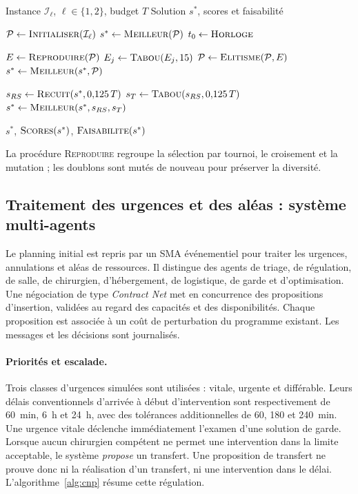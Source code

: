 \documentclass[11pt,a4paper]{article}
\begin{document}
\begin{algorithm}[htbp]
\caption{Schéma de l'hybridation mémétique}
\label{alg:memetique}
\begin{algorithmic}[1]

\Require Instance $\mathcal{I}_{\ell}$, $\ell\in\{1,2\}$, budget $T$
\Ensure Solution $s^*$, scores et faisabilité

\State $\mathcal{P} \gets \Call{Initialiser}{\mathcal{I}_{\ell}}$ 
\State $s^* \gets \Call{Meilleur}{\mathcal{P}}$
\State $t_0 \gets \Call{Horloge}{}$

    \State $E \gets \Call{Reproduire}{\mathcal{P}}$
        \State $E_j \gets \Call{Tabou}{E_j,15}$
    \EndFor
    \State $\mathcal{P} \gets \Call{Elitisme}{\mathcal{P},E}$
    \State $s^* \gets \Call{Meilleur}{s^*,\mathcal{P}}$
\EndWhile

\State $s_{RS} \gets \Call{Recuit}{s^*,0{,}125\,T}$
\State $s_T \gets \Call{Tabou}{s_{RS},0{,}125\,T}$
\State $s^* \gets \Call{Meilleur}{s^*,s_{RS},s_T}$

\State \Return $s^*$, $\Call{Scores}{s^*}$, $\Call{Faisabilite}{s^*}$

\end{algorithmic}
\end{algorithm}

La procédure \textsc{Reproduire} regroupe la sélection par tournoi, le croisement et la mutation ; les doublons sont mutés de nouveau pour préserver la diversité.

\subsection{Traitement des urgences et des aléas : système multi-agents}
\label{sec:sma}

Le planning initial est repris par un SMA événementiel pour traiter les urgences, annulations et aléas de ressources. Il distingue des agents de triage, de régulation, de salle, de chirurgien, d'hébergement, de logistique, de garde et d'optimisation. Une négociation de type \emph{Contract Net} met en concurrence des propositions d'insertion, validées au regard des capacités et des disponibilités. Chaque proposition est associée à un coût de perturbation du programme existant. Les messages et les décisions sont journalisés.

\paragraph{Priorités et escalade.}
Trois classes d'urgences simulées sont utilisées : vitale, urgente et différable. Leurs délais conventionnels d'arrivée à début d'intervention sont respectivement de 60~min, 6~h et 24~h, avec des tolérances additionnelles de 60, 180 et 240~min. Une urgence vitale déclenche immédiatement l'examen d'une solution de garde. Lorsque aucun chirurgien compétent ne permet une intervention dans la limite acceptable, le système \emph{propose} un transfert. Une proposition de transfert ne prouve donc ni la réalisation d'un transfert, ni une intervention dans le délai. L'algorithme~\ref{alg:cnp} résume cette régulation.
\end{document}
